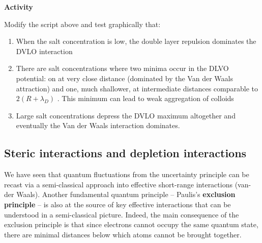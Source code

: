 \documentclass[
  letterpaper,
  enabledeprecatedfontcommands]{report}
\providecommand{\tightlist}{%
  \setlength{\itemsep}{0pt}\setlength{\parskip}{0pt}}
\begin{document}
\begin{tcolorbox}[enhanced jigsaw, leftrule=.75mm, bottomrule=.15mm, colback=white, colframe=quarto-callout-important-color-frame, arc=.35mm, breakable, rightrule=.15mm, left=2mm, opacityback=0, toprule=.15mm]
\begin{minipage}[t]{5.5mm}
\textcolor{quarto-callout-important-color}{\faExclamation}
\end{minipage}%
\begin{minipage}[t]{\textwidth - 5.5mm}

\vspace{-3mm}\textbf{Activity}\vspace{3mm}

Modify the script above and test graphically that:

\begin{enumerate}
\def\labelenumi{\arabic{enumi}.}
\tightlist
\item
  When the salt concentration is low, the double layer repulsion
  dominates the DVLO interaction
\item
  There are salt concentrations where two minima occur in the DLVO
  potential: on at very close distance (dominated by the Van der Waals
  attraction) and one, much shallower, at intermediate distances
  comparable to \(2(R+\lambda_D)\) . This minimum can lead to weak
  aggregation of colloids
\item
  Large salt concentrations depress the DVLO maximum altogether and
  eventually the Van der Waals interaction dominates.
\end{enumerate}

\end{minipage}%
\end{tcolorbox}

\subsection{Steric interactions and depletion
interactions}\label{steric-interactions-and-depletion-interactions}

We have seen that quantum fluctuations from the uncertainty principle
can be recast via a semi-classical approach into effective short-range
interactions (van-der Waals). Another fundamental quantum principle --
Paulis's \textbf{exclusion principle} -- is also at the source of key
effective interactions that can be understood in a semi-classical
picture. Indeed, the main consequence of the exclusion principle is that
since electrons cannot occupy the same quantum state, there are minimal
distances below which atoms cannot be brought together.
\end{document}
